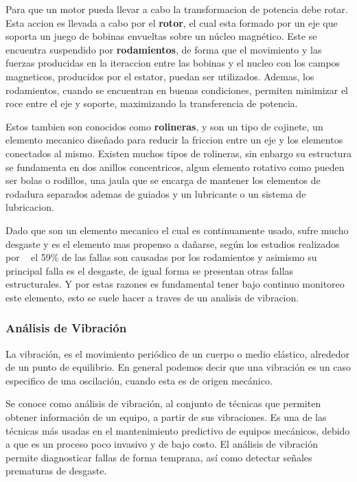 Para que un motor pueda llevar a cabo la transformacion de potencia debe rotar.
Esta accion es llevada a cabo por el \textbf{rotor}, el cual esta formado por un
eje que soporta un juego de bobinas envueltas sobre un núcleo magnético. Este
se encuentra suspendido por \textbf{rodamientos}, de forma que el movimiento y
las fuerzas producidas en la iteraccion entre las bobinas y el nucleo con los
campos magneticos, producidos por el estator, puedan ser utilizados. Ademas,
los rodamientos, cuando se encuentran en buenas condiciones, permiten minimizar
el roce entre el eje y soporte, maximizando la transferencia de potencia.

Estos tambien son conocidos como \textbf{rolineras}, y son un tipo de cojinete,
un elemento mecanico diseñado para reducir la friccion entre un eje y los
elementos conectados al mismo. Existen muchos tipos de rolineras, sin enbargo
su estructura se fundamenta en dos anillos concentricos, algun elemento rotativo
como pueden ser bolas o rodillos, una jaula que se encarga de mantener los
elementos de rodadura separados ademas de guiados y un lubricante o un sistema
de lubricacion.

Dado que son un elemento mecanico el cual es continuamente usado, sufre mucho
desgaste y es el elemento mas propenso a dañarse, según los estudios realizados
por ~\textcite{Kammermann} el 59\% de las fallas son causadas por los rodamientos
y asimismo su principal falla es el desgaste, de igual forma se presentan
otras fallas estructurales. Y por estas razones es fundamental tener bajo continuo
monitoreo este elemento, esto se suele hacer a traves de un analisis de vibracion.

\subsubsection{Análisis de Vibración}

La vibración, es el  movimiento periódico de un cuerpo o medio
elástico, alrededor de un punto de equilibrio. En general podemos decir que una
vibración es un caso especifico de una oscilación, cuando esta es de origen
mecánico.

Se conoce como análisis de vibración, al conjunto de técnicas que permiten
obtener información de un equipo, a partir de sus vibraciones. Es una de las
técnicas más usadas en el mantenimiento predictivo de equipos mecánicos, debido
a que es un proceso poco invasivo y de bajo costo. El análisis de vibración
permite diagnosticar fallas de forma temprana, así como detectar señales
prematuras de desgaste.

